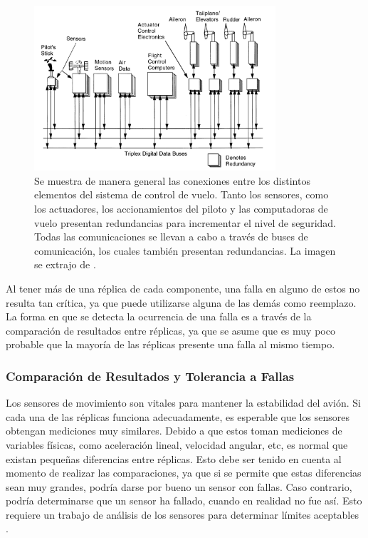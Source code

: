 \begin{figure}[H]
    \centering
    \includegraphics[width=0.8\textwidth]{img/diagrama_general_fly_by_wire.png}
    \caption{Se muestra de manera general las conexiones entre los distintos elementos del sistema de control de vuelo. Tanto los sensores, como los actuadores, los accionamientos del piloto y las computadoras de vuelo presentan redundancias para incrementar el nivel de seguridad. Todas las comunicaciones se llevan a cabo a través de buses de comunicación, los cuales también presentan redundancias. La imagen se extrajo de \cite{collinson2023introduction}.}
    \label{fig:diagrama_general_fly_by_wire}    
\end{figure}

Al tener más de una réplica de cada componente, una falla en alguno de estos no resulta tan crítica, ya que puede utilizarse alguna de las demás como reemplazo. La forma en que se detecta la ocurrencia de una falla es a través de la comparación de resultados entre réplicas, ya que se asume que es muy poco probable que la mayoría de las réplicas presente una falla al mismo tiempo.

\subsubsection{Comparación de Resultados y Tolerancia a Fallas}

Los sensores de movimiento son vitales para mantener la estabilidad del avión. Si cada una de las réplicas funciona adecuadamente, es esperable que los sensores obtengan mediciones muy similares. %
Debido a que estos toman mediciones de variables físicas, como aceleración lineal, velocidad angular, etc, es normal que existan pequeñas diferencias entre réplicas. Esto debe ser tenido en cuenta al momento de realizar las comparaciones, ya que si se permite que estas diferencias sean muy grandes, podría darse por bueno un sensor con fallas. Caso contrario, podría determinarse que un sensor ha fallado, cuando en realidad no fue así. Esto requiere un trabajo de análisis de los sensores para determinar límites aceptables \cite{lala1994architectural}.

